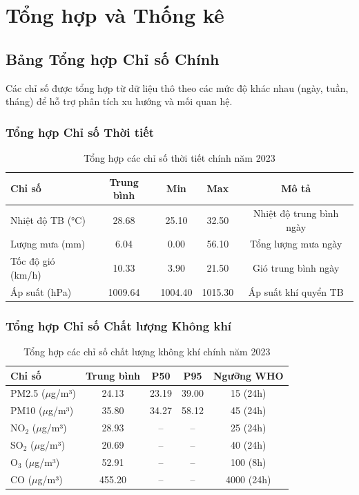 \documentclass[12pt,a4paper]{article}
\begin{document}
\section{Tổng hợp và Thống kê}

\subsection{Bảng Tổng hợp Chỉ số Chính}

Các chỉ số được tổng hợp từ dữ liệu thô theo các mức độ khác nhau (ngày, tuần, tháng) để hỗ trợ phân tích xu hướng và mối quan hệ.

\subsubsection{Tổng hợp Chỉ số Thời tiết}

\begin{table}[H]
\centering
\small
\begin{tabular}{lcccc}
\toprule
\textbf{Chỉ số} & \textbf{Trung bình} & \textbf{Min} & \textbf{Max} & \textbf{Mô tả} \\
\midrule
Nhiệt độ TB (°C) & 28.68 & 25.10 & 32.50 & Nhiệt độ trung bình ngày \\
Lượng mưa (mm) & 6.04 & 0.00 & 56.10 & Tổng lượng mưa ngày \\
Tốc độ gió (km/h) & 10.33 & 3.90 & 21.50 & Gió trung bình ngày \\
Áp suất (hPa) & 1009.64 & 1004.40 & 1015.30 & Áp suất khí quyển TB \\
\bottomrule
\end{tabular}
\caption{Tổng hợp các chỉ số thời tiết chính năm 2023}
\end{table}

\subsubsection{Tổng hợp Chỉ số Chất lượng Không khí}

\begin{table}[H]
\centering
\small
\begin{tabular}{lcccc}
\toprule
\textbf{Chỉ số} & \textbf{Trung bình} & \textbf{P50} & \textbf{P95} & \textbf{Ngưỡng WHO} \\
\midrule
PM2.5 ($\mu$g/m³) & 24.13 & 23.19 & 39.00 & 15 (24h) \\
PM10 ($\mu$g/m³) & 35.80 & 34.27 & 58.12 & 45 (24h) \\
NO$_2$ ($\mu$g/m³) & 28.93 & -- & -- & 25 (24h) \\
SO$_2$ ($\mu$g/m³) & 20.69 & -- & -- & 40 (24h) \\
O$_3$ ($\mu$g/m³) & 52.91 & -- & -- & 100 (8h) \\
CO ($\mu$g/m³) & 455.20 & -- & -- & 4000 (24h) \\
\bottomrule
\end{tabular}
\caption{Tổng hợp các chỉ số chất lượng không khí chính năm 2023}
\end{table}
\end{document}

